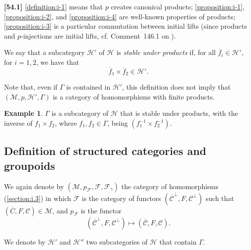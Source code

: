 \documentclass[a4paper,fleqn]{article}
\theoremstyle{plain}
\theoremstyle{definition}
\newenvironment{definition}[1]
  {\renewcommand\theinnerdefinition{#1}\innerdefinition}
  {\endinnerdefinition}
\newtheorem*{example}{Example}
\newenvironment{longcomm}[1]
  {\noindent\textbf{[#1]}\rmfamily}
  {}
\newcommand{\oldpage}[1]{{\marginpar{\footnotesize$\bigg\vert$\,\,\,\,\textit{p.~#1}}}}
\newcommand{\CC}{\mathcal{C}}
\newcommand{\HH}{\mathcal{H}}
\newcommand{\MM}{\mathcal{M}}
\newcommand{\FF}{\mathcal{F}}
\begin{document}
\begin{longcomm}{54.1}
  \cref{definition:i-1} means that $p$ creates canonical products;
  \cref{proposition:i-1}, \cref{proposition:i-2}, and \cref{proposition:i-4} are well-known properties of products;
  \cref{proposition:i-3} is a particular commutation between initial lifts (since products and $p$-injections are initial lifts, cf. Comment~146.1 on \cite{coll66}).
\end{longcomm}

\begin{definition}{2}
\label{definition:ii-2}
  We say that a subcategory $\HH'$ of $\HH$ is \emph{stable under products} if, for all $\overline{f}_i\in\HH'$, for $i=1,2$, we have that
  \[
    \overline{f}_1\times\overline{f}_2
    \in\HH'.
  \]
\end{definition}

Note that, even if $\Gamma$ is contained in $\HH'$, this definition does not imply that $(\MM,p,\HH',\Gamma)$ is a category of homomorphisms with finite products.

\oldpage{383}
\begin{example}
  $\Gamma$ is a subcategory of $\HH$ that is stable under products, with the inverse of $f_1\times f_2$, where $f_1,f_2\in\Gamma$, being $(f_1^{-1}\times f_2^{-1})$.
\end{example}



\subsection{Definition of structured categories and groupoids}
\label{section:ii.2}

We again denote by $(\MM,p_\FF,\FF,\FF_\gamma)$ the category of homomorphisms (\cref{section:i.3}) in which $\FF$ is the category of functors $(\overline{\CC}^\perp,F,\CC^\perp)$ such that $(\overline{C},F,\CC)\in\MM$, and $p_\FF$ is the functor
\[
  (\overline{\CC}^\perp,F,\CC^\perp)
  \longmapsto (\overline{\CC},F,\CC).
\]

We denote by $\HH'$ and $\HH''$ two subcategories of $\HH$ that contain $\Gamma$.
\end{document}
